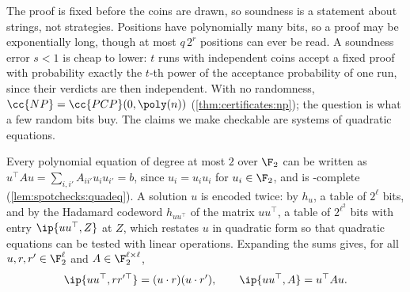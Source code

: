 \begin{refsection}
The proof is fixed before the coins are drawn, so soundness is a statement about strings, not strategies. Positions have polynomially many bits, so a proof may be exponentially long, though at most $q\,2^r$ positions can ever be read. A soundness error $s<1$ is cheap to lower: $t$ runs with independent coins accept a fixed proof with probability exactly the $t$-th power of the acceptance probability of one run, since their verdicts are then independent. With no randomness, $\cc{NP}=\cc{PCP}(0,\poly(n))$ (\cref{thm:certificates:np}); the question is what a few random bits buy. The claims we make checkable are systems of quadratic equations.


Every polynomial equation of degree at most $2$ over $\F_2$ can be written as $u^\top Au=\sum_{i,i'}A_{ii'}u_iu_{i'}=b$, since $u_i=u_iu_i$ for $u_i\in\F_2$, and \spotchecksquadeq{} is -complete (\cref{lem:spotchecks:quadeq}). A solution $u$ is encoded twice: by $h_u$, a table of $2^\ell$ bits, and by the Hadamard codeword $h_{uu^\top}$ of the matrix $uu^\top$, a table of $2^{\ell^2}$ bits with entry $\ip{uu^\top,Z}$ at $Z$, which restates $u$ in quadratic form so that quadratic equations can be tested with linear operations. Expanding the sums gives, for all $u,r,r'\in\F_2^\ell$ and $A\in\F_2^{\ell\times\ell}$,
\begin{equation}\label{eq:spotchecks:identities}
  \ip{uu^\top,rr'^\top}=(u\cdot r)(u\cdot r'),\qquad \ip{uu^\top,A}=u^\top Au.
\end{equation}


\end{refsection}
